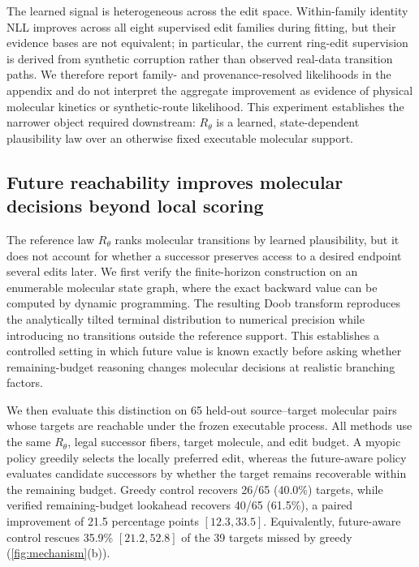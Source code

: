 The learned signal is heterogeneous across the edit space. Within-family identity NLL improves across all eight supervised edit families during fitting, but their evidence bases are not equivalent; in particular, the current ring-edit supervision is derived from synthetic corruption rather than observed real-data transition paths. We therefore report family- and provenance-resolved likelihoods in the appendix and do not interpret the aggregate improvement as evidence of physical molecular kinetics or synthetic-route likelihood. This experiment establishes the narrower object required downstream: $R_\theta$ is a learned, state-dependent plausibility law over an otherwise fixed executable molecular support.

\subsection{Future reachability improves molecular decisions beyond local scoring}
\label{sec:exp-lookahead}

The reference law $R_\theta$ ranks molecular transitions by learned plausibility, but it does not account for whether a successor preserves access to a desired endpoint several edits later. We first verify the finite-horizon construction on an enumerable molecular state graph, where the exact backward value can be computed by dynamic programming. The resulting Doob transform reproduces the analytically tilted terminal distribution to numerical precision while introducing no transitions outside the reference support. This establishes a controlled setting in which future value is known exactly before asking whether remaining-budget reasoning changes molecular decisions at realistic branching factors.

We then evaluate this distinction on 65 held-out source--target molecular pairs whose targets are reachable under the frozen executable process. All methods use the same $R_\theta$, legal successor fibers, target molecule, and edit budget. A myopic policy greedily selects the locally preferred edit, whereas the future-aware policy evaluates candidate successors by whether the target remains recoverable within the remaining budget. Greedy control recovers 26/65 (40.0\%) targets, while verified remaining-budget lookahead recovers 40/65 (61.5\%), a paired improvement of 21.5 percentage points $[12.3,33.5]$. Equivalently, future-aware control rescues 35.9\% $[21.2,52.8]$ of the 39 targets missed by greedy (\cref{fig:mechanism}(b)).

